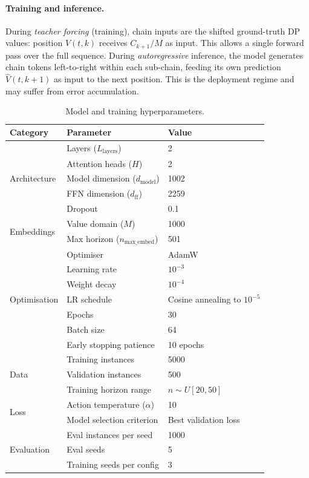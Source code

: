 \documentclass{article}
\begin{document}
\paragraph{Training and inference.}
During \emph{teacher forcing} (training), chain inputs are the shifted ground-truth DP values: position $V(t,k)$ receives $C_{k+1}/M$ as input. This allows a single forward pass over the full sequence. During \emph{autoregressive} inference, the model generates chain tokens left-to-right within each sub-chain, feeding its own prediction $\hat{V}(t, k{+}1)$ as input to the next position. This is the deployment regime and may suffer from error accumulation.

\begin{table}[h]
\centering
\caption{Model and training hyperparameters.}
\label{tab:hyperparams}
\small
\begin{tabular}{lll}
\hline
\textbf{Category} & \textbf{Parameter} & \textbf{Value} \\
\hline
\multirow{5}{*}{Architecture}
  & Layers ($L_{\mathrm{layers}}$) & 2 \\
  & Attention heads ($H$) & 2 \\
  & Model dimension ($d_{\mathrm{model}}$) & 1002 \\
  & FFN dimension ($d_{\mathrm{ff}}$) & 2259 \\
  & Dropout & 0.1 \\
\hline
\multirow{2}{*}{Embeddings}
  & Value domain ($M$) & 1000 \\
  & Max horizon ($n_{\mathrm{max\_embed}}$) & 501 \\
\hline
\multirow{7}{*}{Optimisation}
  & Optimiser & AdamW \\
  & Learning rate & $10^{-3}$ \\
  & Weight decay & $10^{-4}$ \\
  & LR schedule & Cosine annealing to $10^{-5}$ \\
  & Epochs & 30 \\
  & Batch size & 64 \\
  & Early stopping patience & 10 epochs \\
\hline
\multirow{3}{*}{Data}
  & Training instances & 5000 \\
  & Validation instances & 500 \\
  & Training horizon range & $n \sim U[20, 50]$ \\
\hline
\multirow{2}{*}{Loss}
  & Action temperature ($\alpha$) & 10 \\
  & Model selection criterion & Best validation loss \\
\hline
\multirow{3}{*}{Evaluation}
  & Eval instances per seed & 1000 \\
  & Eval seeds & 5 \\
  & Training seeds per config & 3 \\
\hline
\end{tabular}
\end{table}
\end{document}
